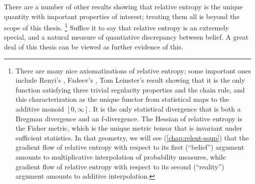 There are a number of other results showing that relative entropy is the unique quantity with important properties of interest; treating them all is beyond the scope of this thesis.%
\footnote{%
There are many nice axiomatizations of relative entropy;
some important ones include Renyi's \citep{renyi1961measures}, Fadeev's \citep{fadeev1957begriff}, Tom Leinster's result showing
that it is the only function satisfying three trivial regularity
properties and the chain rule, and this characterization as the unique
functor from statistical maps to the additive monoid $[0,\infty]$.  It is the
only statistical divergence that is both a Bregman divergence and an
f-divergence.  The Hessian of relative entropy is the Fisher metric, 
which is the unique metric tensor that is invariant under sufficient statistics. 
In that geometry, we will see (\cref{chap:relent-soup}) that the gradient flow of relative entropy
with respect to its first (``belief'') argument amounts to
multiplicative interpolation of probability measures, while gradient
flow of relative entropy with respect to its second (``reality'')
argument amounts to additive interpolation. 
}
%
Suffice it to say that relative entropy is an extremely special,
    and a natural measure of quantiative discrepancy between belief. 
A great deal of this thesis can be viewed as further evidence of this. 
    
%




